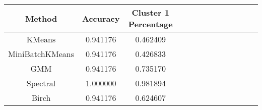 \begin{tabular}{ccccccccccccc}
\toprule
         Method &  Accuracy &  Cluster 1 Percentage \\
\midrule
         KMeans &  0.941176 &              0.462409 \\
MiniBatchKMeans &  0.941176 &              0.426833 \\
            GMM &  0.941176 &              0.735170 \\
       Spectral &  1.000000 &              0.981894 \\
          Birch &  0.941176 &              0.624607 \\
\bottomrule
\end{tabular}
